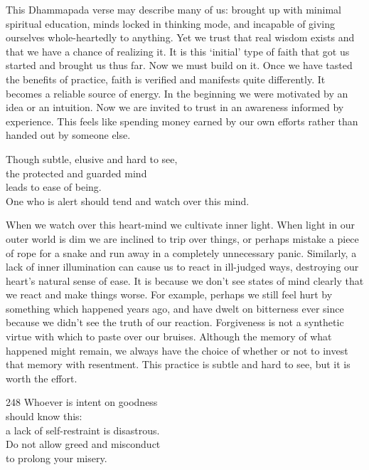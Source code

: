 \begin{dhpRefl}
  This Dhammapada verse may describe many of us: brought up with \mbox{minimal}
  spiritual education, minds locked in thinking mode, and incapable of giving
  ourselves whole-heartedly to anything. Yet we trust that real wisdom exists
  and that we have a chance of realizing it. It is this ‘initial’ type of faith
  that got us started and brought us thus far. Now we must build on it. Once we
  have tasted the benefits of practice, faith is verified and manifests quite
  differently. It becomes a reliable source of energy. In the beginning we were
  motivated by an idea or an intuition. Now we are invited to trust in an
  awareness informed by experience. This feels like spending money earned by our
  own efforts rather than handed out by someone else.
\end{dhpRefl}


\begin{dhpVerse}{36}
\label{dhp-36}
Though subtle, elusive and hard to see,\\
the protected and guarded mind\\
leads to ease of being.\\
One who is alert should tend and watch over this mind.
\end{dhpVerse}

\begin{dhpRefl}
  When we watch over this heart-mind we cultivate inner light. When light in our
  outer world is dim we are inclined to trip over things, or perhaps mistake a
  piece of rope for a snake and run away in a completely unnecessary panic.
  Similarly, a lack of inner illumination can cause us to react in ill-judged
  ways, destroying our heart’s natural sense of ease. It is because we don’t see
  states of mind clearly that we react and make things worse. For example,
  perhaps we still feel hurt by something which happened years ago, and have
  dwelt on bitterness ever since because we didn’t see the truth of our
  reaction. Forgiveness is not a synthetic virtue with which to paste over our
  bruises. Although the memory of what happened might remain, we always have the
  choice of whether or not to invest that memory with resentment. This practice
  is subtle and hard to see, but it is worth the effort.
\end{dhpRefl}


\begin{dhpVerse}{248}
\label{dhp-248}
Whoever is intent on goodness\\
should know this:\\
a lack of self-restraint is disastrous.\\
Do not allow greed and misconduct\\
to prolong your misery.
\end{dhpVerse}

